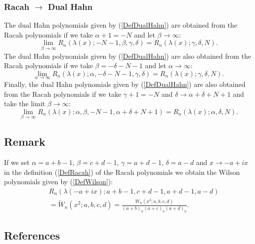 \documentclass[envcountchap,graybox]{svmono}
\newcounter{rom}
\begin{document}
\subsubsection*{Racah $\rightarrow$ Dual Hahn}
The dual Hahn polynomials given by (\ref{DefDualHahn}) are obtained from the Racah polynomials
if we take $\alpha+1=-N$ and let $\beta\rightarrow\infty$:
\begin{equation}
\lim_{\beta\rightarrow\infty}
R_n(\lambda(x);-N-1,\beta,\gamma,\delta)=R_n(\lambda(x);\gamma,\delta,N).
\end{equation}
The dual Hahn polynomials given by (\ref{DefDualHahn}) are also obtained from the Racah polynomials
if we take $\beta=-\delta-N-1$ and let $\alpha\rightarrow\infty$:
\begin{equation}
\lim_{\alpha\rightarrow\infty}
R_n(\lambda(x);\alpha,-\delta-N-1,\gamma,\delta)=R_n(\lambda(x);\gamma,\delta,N).
\end{equation}
Finally, the dual Hahn polynomials given by (\ref{DefDualHahn}) are also obtained from the Racah polynomials
if we take $\gamma+1=-N$ and $\delta\rightarrow\alpha+\delta+N+1$ and take the limit $\beta\rightarrow\infty$:
\begin{equation}
\lim_{\beta\rightarrow\infty}
R_n(\lambda(x);\alpha,\beta,-N-1,\alpha+\delta+N+1)=R_n(\lambda(x);\alpha,\delta,N).
\end{equation}

\newpage

\subsection*{Remark}
If we set $\alpha=a+b-1$, $\beta=c+d-1$, $\gamma=a+d-1$, $\delta=a-d$ and $x\rightarrow
-a+ix$ in the definition (\ref{DefRacah}) of the Racah polynomials we obtain
the Wilson polynomials given by (\ref{DefWilson}):
\begin{eqnarray*}
& &R_n(\lambda(-a+ix);a+b-1,c+d-1,a+d-1,a-d)\\
& &{}=\tilde{W}_n(x^2;a,b,c,d)=\frac{W_n(x^2;a,b,c,d)}{(a+b)_n(a+c)_n(a+d)_n}.
\end{eqnarray*}

\subsection*{References}
\label{sec9.2}
\end{document}

